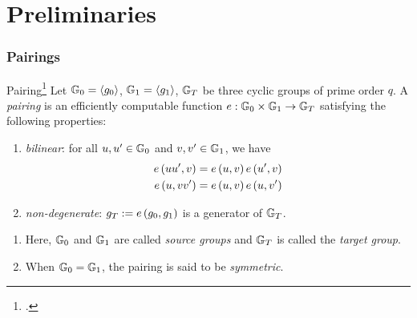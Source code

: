 \documentclass{beamer}
\begin{document}
    \section{Preliminaries}

    \begin{frame}
        \frametitle{Pairings}
        \begin{definition}{Pairing\footcite{GraduateCourseApplied}}
            Let \(\mathbb G_0 = \left\langle g_0 \right\rangle\), \(\mathbb G_1 = \left\langle g_1 \right\rangle\), \(\mathbb G_T\) be
            three cyclic groups of prime order \(q\). A \emph{pairing} is an
            efficiently computable function \(e: \mathbb G_0 \times \mathbb G_1 \rightarrow
            \mathbb G_T\) satisfying the following properties:
            \begin{enumerate}
                \item \emph{bilinear}: for all \(u, u^{\prime} \in \mathbb G_0\) and
                \(v, v^{\prime} \in \mathbb G_1\), we have
                \begin{align}
                    e\left(uu^{\prime}, v\right) &= e\left(u,v\right)e\left(u^{\prime},v\right) \\
                    e\left(u, vv^{\prime}\right) &= e\left(u,v\right)e\left(u, v^{\prime}\right)
                \end{align}
                \item \emph{non-degenerate}: \(g_T := e\left(g_0, g_1\right)\) is a
                generator of \(\mathbb G_T\).
            \end{enumerate}
        \end{definition}
        \begin{enumerate}
            \item<2-> Here, \(\mathbb G_0\) and \(\mathbb G_1\) are called \emph{source
            groups} and \(\mathbb G_T\) is called the \emph{target group}.
            \item<3-> When \(\mathbb G_0 = \mathbb G_1\), the pairing is said to be
            \emph{symmetric}.
        \end{enumerate}
    \end{frame}
\end{document}
